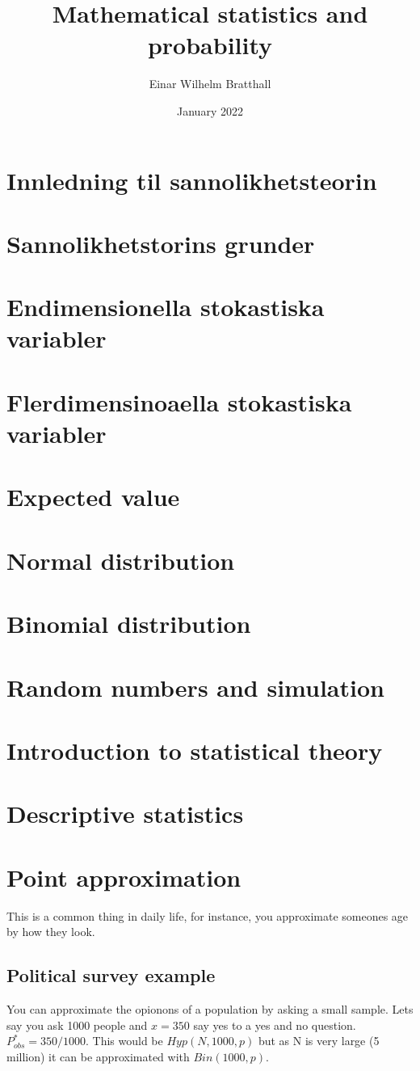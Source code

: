 \documentclass{article}
\title{Mathematical statistics and probability}
\author{Einar Wilhelm Bratthall}
\date{January 2022}
\begin{document}
\maketitle

\section{Innledning til sannolikhetsteorin}
\section{Sannolikhetstorins grunder}
\section{Endimensionella stokastiska variabler}
\section{Flerdimensinoaella stokastiska variabler}
\section{Expected value}
\section{Normal distribution}
\section{Binomial distribution}
\section{Random numbers and simulation}
\section{Introduction to statistical theory}
\section{Descriptive statistics}
\section{Point approximation}
    This is a common thing in daily life, for instance, you approximate someones
    age by how they look. 
    \subsection{Political survey example}
        You can approximate the opionons of a population by asking a small sample.
        Lets say you ask 1000 people and  $x = 350$ say yes to a yes and no question.
        $P_{obs}^* = 350/1000$. This would be $Hyp(N, 1000, p)$ but as N is very large
        (5 million) it can be approximated with $Bin(1000,p)$.\\
\end{document}
